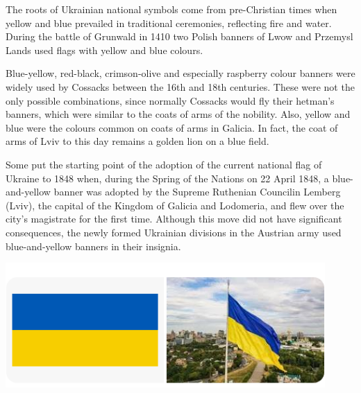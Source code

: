 \documentclass{article}
\begin{document}
The roots of Ukrainian national symbols come from pre-Christian times when yellow and blue prevailed in traditional ceremonies, reflecting fire and water. During the battle of Grunwald in 1410 two Polish banners of Lwow and Przemysl Lands used flags with yellow and blue colours.

Blue-yellow, red-black, crimson-olive and especially raspberry colour banners were widely used by Cossacks between the 16th and 18th centuries. These were not the only possible combinations, since normally Cossacks would fly their hetman's banners, which were similar to the coats of arms of the nobility. Also, yellow and blue were the colours common on coats of arms in Galicia. In fact, the coat of arms of Lviv to this day remains a golden lion on a blue field.

Some put the starting point of the adoption of the current national flag of Ukraine to 1848 when, during the Spring of the Nations on 22 April 1848, a blue-and-yellow banner was adopted by the Supreme Ruthenian Councilin Lemberg (Lviv), the capital of the Kingdom of Galicia and Lodomeria, and flew over the city's magistrate for the first time. Although this move did not have significant consequences, the newly formed Ukrainian divisions in the Austrian army used blue-and-yellow banners in their insignia.

\begin{center}
\includegraphics [width=345pt,keepaspectratio]{зображення_2022-12-10_195419904.png}
\end{center}
\end{document}
